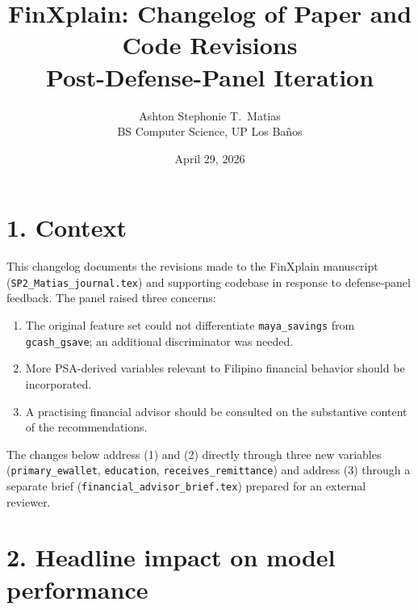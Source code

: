 \documentclass[11pt,a4paper]{article}
\title{\Large FinXplain: Changelog of Paper and Code Revisions \\[2pt]
       \large Post-Defense-Panel Iteration}
\author{Ashton Stephonie T.\ Matias \\
        BS Computer Science, UP Los Ba\~{n}os}
\date{April 29, 2026}
\begin{document}
\maketitle
\thispagestyle{empty}

\section*{1. Context}

This changelog documents the revisions made to the FinXplain manuscript
(\texttt{SP2\_Matias\_journal.tex}) and supporting codebase in response to
defense-panel feedback. The panel raised three concerns:

\begin{enumerate}
    \item The original feature set could not differentiate
    \texttt{maya\_savings} from \texttt{gcash\_gsave}; an additional
    discriminator was needed.
    \item More PSA-derived variables relevant to Filipino financial
    behavior should be incorporated.
    \item A practising financial advisor should be consulted on the
    substantive content of the recommendations.
\end{enumerate}

The changes below address (1) and (2) directly through three new variables
(\texttt{primary\_ewallet}, \texttt{education}, \texttt{receives\_remittance})
and address (3) through a separate brief
(\texttt{financial\_advisor\_brief.tex}) prepared for an external reviewer.

\section*{2. Headline impact on model performance}
\end{document}
